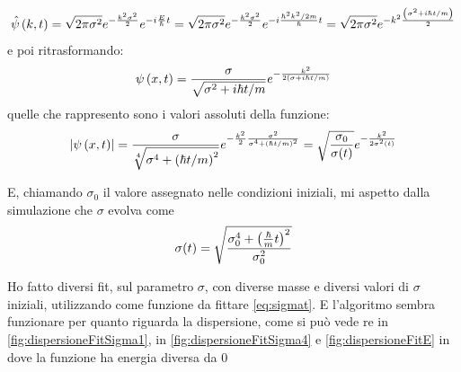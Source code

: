 \begin{equation}
\hat{\psi}\lrt{k,t} = \sqrt{2\pi\sigma^2} e^{-\frac{k^2 \sigma^2}2} e^{-i\frac E\hbar t} =
\sqrt{2\pi\sigma^2} e^{-\frac{k^2 \sigma^2}2} e^{-i\frac {\hbar^2 k^2/2m}\hbar t} = 
\sqrt{2\pi\sigma^2} e^{-k^2\frac{\lrt{\sigma^2+i\hbar t/m}}2 }
\end{equation}
e poi ritrasformando:
\begin{equation}
\psi\lrt{x,t} = \frac{\sigma}{\sqrt{\sigma^2 + i\hbar t /m}}
e^{-\frac{k^2}{2\lrt{\sigma + i\hbar t/m}}}
\end{equation}
quelle che rappresento sono i valori assoluti della funzione:
\begin{equation}
\lr||{\psi\lrt{x,t}} = \frac{\sigma}{\sqrt[4]{\sigma^4 + \lrt{\hbar t /m}^2}}
e^{-\frac{k^2}2\frac{\sigma^2}{\sigma^4 + \lrt{\hbar t /m}^2}} = \sqrt{\frac{\sigma_0}{\sigma(t)}}e^{-\frac{k^2}{2\sigma^2(t)}}
\end{equation}

E, chiamando $\sigma_0$ il valore assegnato nelle condizioni iniziali, mi aspetto dalla simulazione che $\sigma$ evolva come
\begin{equation}\label{eq:sigmat}
\sigma(t) = \sqrt{\frac{\sigma_0^4+\lrt{\frac\hbar m t}^2}{\sigma_0^2}}
\end{equation}

Ho fatto diversi fit, sul parametro $\sigma$, con diverse masse e diversi valori di $\sigma$ iniziali, utilizzando come funzione da fittare \eqref{eq:sigmat}. E l'algoritmo sembra funzionare per quanto riguarda la dispersione,  come si pu\`o vede re in \autoref{fig:dispersioneFitSigma1}, in
\autoref{fig:dispersioneFitSigma4} e \autoref{fig:dispersioneFitE} in dove la funzione ha energia diversa da 0

